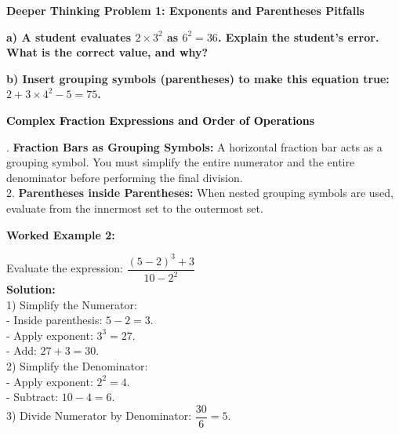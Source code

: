 \documentclass[12pt, letterpaper, fleqn]{article}
\begin{document}
\begin{tcolorbox}[colback=black!5, colframe=black!50, boxrule=1pt, arc=4mm, left=6mm, right=6mm, top=5mm, bottom=5mm]
\textbf{Deeper Thinking Problem 1: Exponents and Parentheses Pitfalls}

\medskip

\noindent
\textbf{a) A student evaluates $2 \times 3^2$ as $6^2 = 36$. Explain the student's error. What is the correct value, and why?}

\vspace{2cm}

\noindent
\textbf{b) Insert grouping symbols (parentheses) to make this equation true: $2 + 3 \times 4^2 - 5 = 75$.}

\vspace{2cm}
\end{tcolorbox}
\newpage

\begin{tcolorbox}[colback=black!10]
    \large\textcolor{black}{\textbf{Complex Fraction Expressions and Order of Operations}}
\end{tcolorbox}

\vspace{3mm}

. \textbf{Fraction Bars as Grouping Symbols:} A horizontal fraction bar acts as a grouping symbol. You must simplify the entire numerator and the entire denominator before performing the final division. \\
2. \textbf{Parentheses inside Parentheses:} When nested grouping symbols are used, evaluate from the innermost set to the outermost set.

\vspace{4mm}

\begin{tcolorbox}[colback=white, colframe=black!25, boxrule=0.6pt, arc=4mm, left=6mm, right=6mm, top=5mm, bottom=5mm]
\textbf{Worked Example 2:}

\medskip
\noindent
Evaluate the expression: $\dfrac{(5 - 2)^3 + 3}{10 - 2^2}$\\
\textbf{Solution:} \\
1) Simplify the Numerator: \\
- Inside parenthesis: $5 - 2 = 3$. \\
- Apply exponent: $3^3 = 27$. \\
- Add: $27 + 3 = 30$. \\
2) Simplify the Denominator: \\
- Apply exponent: $2^2 = 4$. \\
- Subtract: $10 - 4 = 6$. \\
3) Divide Numerator by Denominator: $\dfrac{30}{6} = 5$.
\end{tcolorbox}
\end{document}
